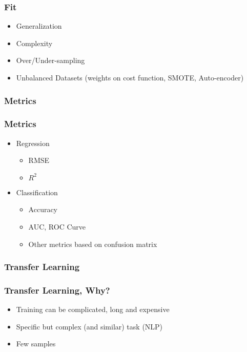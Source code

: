 \begin{frame}\frametitle{Fit}
   \begin{itemize}
      \item Generalization
      \item Complexity
      \item Over/Under-sampling
      \item Unbalanced Datasets (weights on cost function, SMOTE, Auto-encoder)
   \end{itemize}
\end{frame}


\subsubsection{Metrics}

\begin{frame}\frametitle{Metrics}
   \begin{itemize}
      \item Regression
      \begin{itemize}
         \item RMSE
         \item $R^2$
      \end{itemize}

      \item Classification
      \begin{itemize}
         \item Accuracy
         \item AUC, ROC Curve
         \item Other metrics based on confusion matrix
      \end{itemize}
   \end{itemize}
\end{frame}


\subsubsection{Transfer Learning}

\begin{frame}\frametitle{Transfer Learning, Why?}
   \begin{itemize}
      \item Training can be complicated, long and expensive
      \item Specific but complex (and similar) task (NLP)
      \item Few samples
   \end{itemize}
\end{frame}

